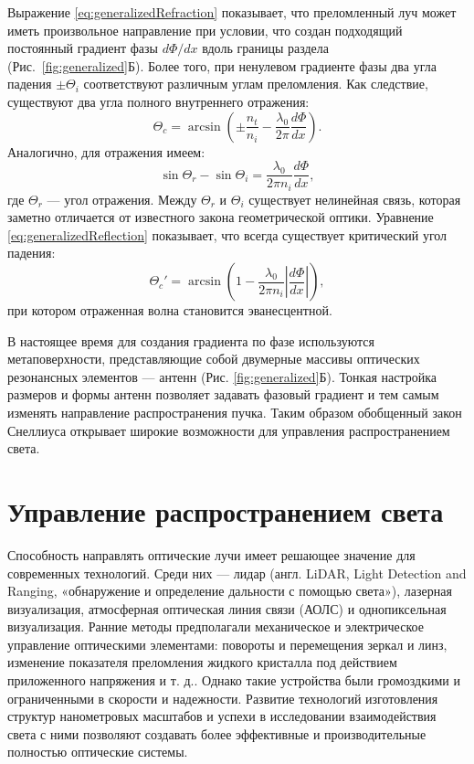 Выражение \eqref{eq:generalizedRefraction} показывает, что преломленный луч может иметь произвольное направление при условии, что создан подходящий постоянный градиент фазы $d\Phi/dx$ вдоль границы раздела (Рис.~\ref{fig:generalized}Б). Более того, при ненулевом градиенте фазы два угла падения $\pm \Theta_i$ соответствуют различным углам преломления. Как следствие, существуют два угла полного внутреннего отражения:
\begin{equation}
    \Theta_c = \arcsin \left(\pm\frac{n_t}{n_i} - \frac{\lambda_0}{2\pi}\frac{d\Phi}{dx}\right).
\end{equation}
Аналогично, для отражения имеем:
\begin{equation}
    \label{eq:generalizedReflection}
    \sin\Theta_r - \sin\Theta_i = \frac{\lambda_0}{2\pi n_i}\frac{d\Phi}{dx},
\end{equation}
где $\Theta_r$ --- угол отражения. Между $\Theta_r$ и $\Theta_i$ существует нелинейная связь, которая заметно отличается от известного закона геометрической оптики. Уравнение \eqref{eq:generalizedReflection} показывает, что всегда существует критический угол падения:
\begin{equation}
    \Theta_c' = \arcsin\left(1 - \frac{\lambda_0}{2\pi n_i}\left|\frac{d\Phi}{dx}\right|\right),
\end{equation}
при котором отраженная волна становится эванесцентной.

В настоящее время для создания градиента по фазе используются метаповерхности, представляющие собой двумерные массивы оптических резонансных элементов --- антенн (Рис. \ref{fig:generalized}Б). Тонкая настройка размеров и формы антенн позволяет задавать фазовый градиент и тем самым изменять направление распространения пучка. Таким образом обобщенный закон Снеллиуса открывает широкие возможности для управления распространением света.


\section{Управление распространением света}

Способность направлять оптические лучи имеет решающее значение для современных технологий. Среди них — лидар (англ. LiDAR, Light Detection and Ranging, «обнаружение и определение дальности с помощью света»)\cite{jaboyedoff2012use}, лазерная визуализация\cite{holmstrom2014mems}, атмосферная оптическая линия связи (АОЛС)\cite{khalighi2014survey} и однопиксельная визуализация\cite{edgar2019principles}. Ранние методы предполагали механическое и электрическое управление оптическими элементами: повороты и перемещения зеркал и линз, изменение показателя преломления жидкого кристалла под действием приложенного напряжения и т. д.\cite{tholl2006novel}. Однако такие устройства были громоздкими и ограниченными в скорости и надежности. Развитие технологий изготовления структур нанометровых масштабов и успехи в исследовании взаимодействия света с ними позволяют создавать более эффективные и производительные полностью оптические системы.

